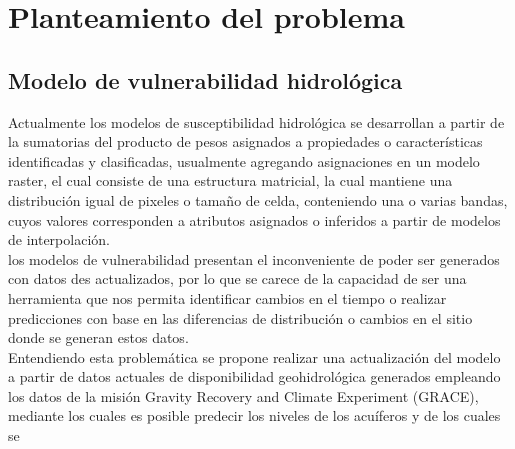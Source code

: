 \chapter{Planteamiento del problema}

\section{Modelo de vulnerabilidad hidrológica}

	Actualmente los modelos de susceptibilidad hidrológica se desarrollan a partir de la sumatorias del producto de pesos asignados a propiedades o características identificadas y clasificadas, usualmente agregando asignaciones en un modelo raster, el cual consiste de una estructura matricial, la cual mantiene una distribución igual de pixeles o tamaño de celda, conteniendo una o varias bandas, cuyos valores corresponden a atributos asignados o inferidos a partir de modelos de interpolación.\\
	
	los modelos de vulnerabilidad presentan el inconveniente de poder ser generados con datos des actualizados, por lo que se carece de la capacidad de ser una herramienta que nos permita identificar cambios en el tiempo o realizar predicciones con base en las diferencias de distribución o cambios en el sitio donde se generan estos datos.\\
	
	Entendiendo esta problemática se propone realizar una actualización del modelo a partir de datos actuales de disponibilidad geohidrológica generados empleando los datos de la misión Gravity Recovery and Climate Experiment (GRACE), mediante los cuales es posible predecir los niveles de los acuíferos y de los cuales se 
	
